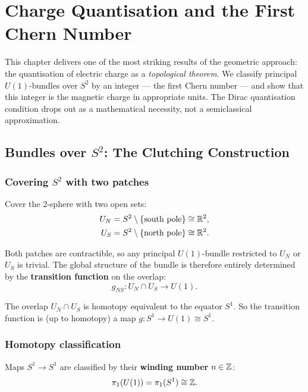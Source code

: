 \chapter{Charge Quantisation and the First Chern Number}

This chapter delivers one of the most striking results of the geometric approach: the quantisation of electric charge as a \emph{topological theorem}. We classify principal $U(1)$-bundles over $S^2$ by an integer --- the first Chern number --- and show that this integer is the magnetic charge in appropriate units. The Dirac quantisation condition drops out as a mathematical necessity, not a semiclassical approximation.

\section{Bundles over $S^2$: The Clutching Construction}

\subsection{Covering $S^2$ with two patches}

Cover the 2-sphere with two open sets:
\begin{align}
U_N &= S^2 \setminus \{\text{south pole}\} \cong \mathbb{R}^2, \\
U_S &= S^2 \setminus \{\text{north pole}\} \cong \mathbb{R}^2.
\end{align}

Both patches are contractible, so any principal $U(1)$-bundle restricted to $U_N$ or $U_S$ is trivial. The global structure of the bundle is therefore entirely determined by the \textbf{transition function} on the overlap:
\begin{equation}
g_{NS}: U_N \cap U_S \to U(1).
\end{equation}

The overlap $U_N \cap U_S$ is homotopy equivalent to the equator $S^1$. So the transition function is (up to homotopy) a map $g: S^1 \to U(1) \cong S^1$.

\subsection{Homotopy classification}

Maps $S^1 \to S^1$ are classified by their \textbf{winding number} $n \in \mathbb{Z}$:
\begin{equation}
\pi_1(U(1)) = \pi_1(S^1) \cong \mathbb{Z}.
\end{equation}

